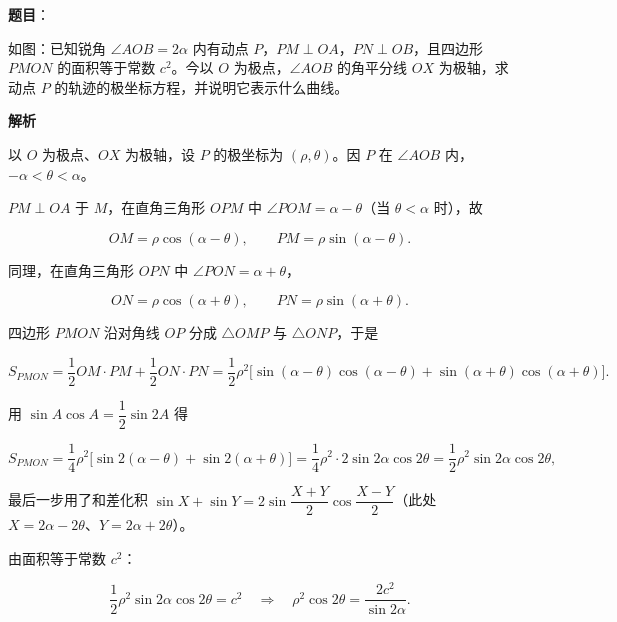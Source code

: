 \begin{answer}

\textbf{题目}：

如图：已知锐角 $\angle AOB=2\alpha$ 内有动点 $P$，$PM\perp OA$，$PN\perp OB$，且四边形 $PMON$ 的面积等于常数 $c^2$。今以 $O$ 为极点，$\angle AOB$ 的角平分线 $OX$ 为极轴，求动点 $P$ 的轨迹的极坐标方程，并说明它表示什么曲线。
\nopagebreak[4]
\begin{center}\end{center}
\nopagebreak[4]
\textbf{解析}
\nopagebreak[4]
\begin{center}\end{center}
\nopagebreak[4]
以 $O$ 为极点、$OX$ 为极轴，设 $P$ 的极坐标为 $(\rho,\theta)$。因 $P$ 在 $\angle AOB$ 内，$-\alpha<\theta<\alpha$。

$PM\perp OA$ 于 $M$，在直角三角形 $OPM$ 中 $\angle POM=\alpha-\theta$（当 $\theta<\alpha$ 时），故

\nopagebreak[4]
\[
OM=\rho\cos(\alpha-\theta),\qquad PM=\rho\sin(\alpha-\theta).
\]

同理，在直角三角形 $OPN$ 中 $\angle PON=\alpha+\theta$，

\nopagebreak[4]
\[
ON=\rho\cos(\alpha+\theta),\qquad PN=\rho\sin(\alpha+\theta).
\]

四边形 $PMON$ 沿对角线 $OP$ 分成 $\triangle OMP$ 与 $\triangle ONP$，于是

\nopagebreak[4]
\[
S_{PMON}=\frac12OM\cdot PM+\frac12ON\cdot PN
=\frac12\rho^2\bigl[\sin(\alpha-\theta)\cos(\alpha-\theta)+\sin(\alpha+\theta)\cos(\alpha+\theta)\bigr].
\]

用 $\sin A\cos A=\dfrac12\sin2A$ 得

\nopagebreak[4]
\[
S_{PMON}=\frac14\rho^2\bigl[\sin2(\alpha-\theta)+\sin2(\alpha+\theta)\bigr]
=\frac14\rho^2\cdot2\sin2\alpha\cos2\theta
=\frac12\rho^2\sin2\alpha\cos2\theta,
\]

最后一步用了和差化积 $\sin X+\sin Y=2\sin\dfrac{X+Y}{2}\cos\dfrac{X-Y}{2}$（此处 $X=2\alpha-2\theta$、$Y=2\alpha+2\theta$）。

由面积等于常数 $c^2$：

\nopagebreak[4]
\[
\frac12\rho^2\sin2\alpha\cos2\theta=c^2
\quad\Longrightarrow\quad
\rho^2\cos2\theta=\frac{2c^2}{\sin2\alpha}.
\]


\end{answer}

